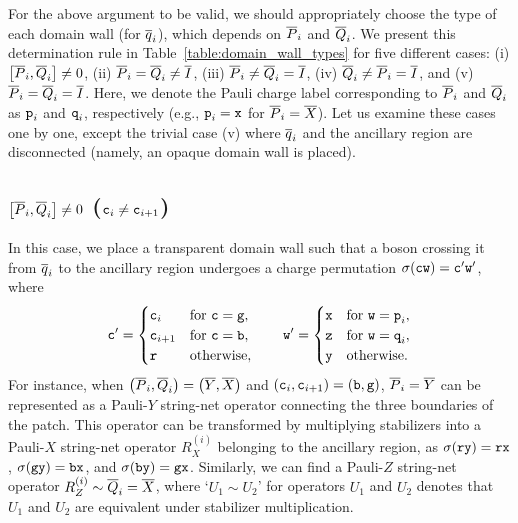 \documentclass[
 prx,
 reprint,
 superscriptaddress,
 longbibliography,
 dvipsnames
]{revtex4-2}
\begin{document}
For the above argument to be valid, we should appropriately choose the type of each domain wall (for $\overline{q}_{i}$), which depends on $\overline{P}_i$ and $\overline{Q}_i$.
We present this determination rule in Table~\ref{table:domain_wall_types} for five different cases: (i) $\comm{\lgc{P}_i}{\lgc{Q}_i} \neq 0$, (ii) $\overline{P}_i = \overline{Q}_i \neq \overline{I}$, (iii) $\overline{P}_i \neq \overline{Q}_i = \overline{I}$, (iv) $\overline{Q}_i \neq \overline{P}_i = \overline{I}$, and (v) $\overline{P}_i = \overline{Q}_i = \overline{I}$.
Here, we denote the Pauli charge label corresponding to $\overline{P}_i$ and $\overline{Q}_i$ as $\texttt{p}_i$ and $\texttt{q}_i$, respectively (e.g., $\texttt{p}_i = \texttt{x}$ for $\overline{P}_i = \overline{X}$). 
Let us examine these cases one by one, except the trivial case (v) where $\overline{q}_{i}$ and the ancillary region are disconnected (namely, an opaque domain wall is placed).

\subsection{$\comm{\lgc{P}_i}{\lgc{Q}_i} \neq 0$ ($\texttt{c}_i \neq \texttt{c}_{i+1}$)}


In this case, we place a transparent domain wall such that a boson crossing it from $\overline{q}_{i}$ to the ancillary region undergoes a charge permutation $\sigma(\texttt{c}\texttt{w}) = \texttt{c}'\texttt{w}'$, where
\begin{align*}
    \texttt{c}' = \begin{cases}
        \texttt{c}_i & \text{for } \texttt{c} = \texttt{g}, \\
        \texttt{c}_{i+1} & \text{for } \texttt{c} = \texttt{b}, \\
        \texttt{r} & \text{otherwise},
    \end{cases}\qquad
    \texttt{w}' = \begin{cases}
        \texttt{x} & \text{for } \texttt{w} = \texttt{p}_i, \\
        \texttt{z} & \text{for } \texttt{w} = \texttt{q}_i, \\
        \texttt{y} & \text{otherwise}.
    \end{cases}
\end{align*}
For instance, when $\qty(\overline{P}_i, \overline{Q}_i) = \qty(\overline{Y}, \overline{X})$ and $\qty(\texttt{c}_i, \texttt{c}_{i+1}) = \qty(\texttt{b}, \texttt{g})$, $\overline{P}_i=\overline{Y}$ can be represented as a Pauli-$Y$ string-net operator connecting the three boundaries of the patch.
This operator can be transformed by multiplying stabilizers into a Pauli-$X$ string-net operator $R_X^{(i)}$ belonging to the ancillary region, as $\sigma(\texttt{ry}) = \texttt{rx}$, $\sigma(\texttt{gy})=\texttt{bx}$, and $\sigma(\texttt{by})=\texttt{gx}$.
Similarly, we can find a Pauli-$Z$ string-net operator $R_Z^{(i)} \sim \overline{Q}_i= \overline{X}$, where `$U_1 \sim U_2$' for operators $U_1$ and $U_2$ denotes that $U_1$ and $U_2$ are equivalent under stabilizer multiplication.
\end{document}
